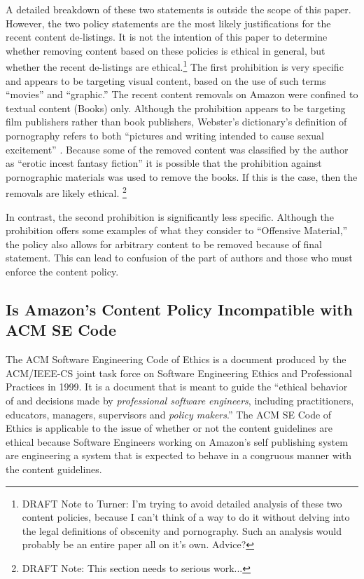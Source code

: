 \documentclass[11pt]{article}
\begin{document}
\begin{multicols}{2}
A detailed breakdown of these two statements is outside the scope of this paper.  However, the two policy statements are the most likely justifications for the recent content de-listings.  It is not the intention of this paper to determine whether removing content based on these policies is ethical in general, but whether the recent de-listings are ethical.\footnote{DRAFT Note to Turner: I'm trying to avoid detailed analysis of these two content policies, because I can't think of a way to do it without delving into the legal definitions of obscenity and pornography.  Such an analysis would probably be an entire paper all on it's own. Advice?} The first prohibition is very specific and appears to be targeting visual content, based on the use of such terms ``movies'' and ``graphic.''  The recent content removals on Amazon were confined to textual content (Books) only.  Although the prohibition appears to be targeting film publishers rather than book publishers, Webster's dictionary's definition of pornography refers to both ``pictures and writing intended to cause sexual excitement'' \cite{WebsterOnlineDict}.  Because some of the removed content was classified by the author as ``erotic incest fantasy fiction'' \cite{KittSelfPubRevolution} it is possible that the prohibition against pornographic materials was used to remove the books.  If this is the case, then the removals are likely ethical.  \footnote{DRAFT Note: This section needs to serious work...}

In contrast, the second prohibition is significantly less specific. Although the prohibition offers some examples of what they consider to ``Offensive Material,'' the policy also allows for arbitrary content to be removed because of final statement. This can lead to confusion of the part of authors and those who must enforce the content policy.  


\subsection{Is Amazon's Content Policy Incompatible with ACM SE Code}

The ACM Software Engineering Code of Ethics is a document produced by the ACM/IEEE-CS joint task force on Software Engineering Ethics and Professional Practices in 1999.  It is a document that is meant to guide the ``ethical behavior of and decisions made by \emph{professional software engineers}, including practitioners, educators, managers, supervisors and \emph{policy makers}.'' \cite[Emphasis Mine]{SECode} The ACM SE Code of Ethics is applicable to the issue of whether or not the content guidelines are ethical because Software Engineers working on Amazon's self publishing system are engineering a system that is expected to behave in a congruous manner with the content guidelines.


\end{multicols}
\end{document}

